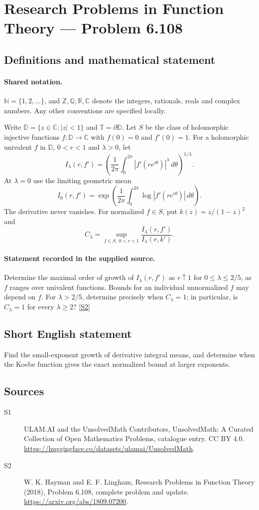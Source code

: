 \documentclass[11pt]{article}
\newcommand{\sref}[2]{\hyperlink{source:#1:#2}{[S#2]}}
\begin{document}
\section{Research Problems in Function Theory — Problem 6.108}\label{statement}

\subsection{Definitions and mathematical statement}

\paragraph{Shared notation.}$\mathbb N=\{1,2,\ldots\}$, and $\mathbb Z,\mathbb Q,\mathbb R,\mathbb C$ denote the integers, rationals, reals and complex numbers. Any other conventions are specified locally.


Write $\mathbb D=\{z\in\mathbb C:|z|<1\}$ and $\mathbb T=\partial\mathbb D$. Let $S$ be the class of holomorphic injective functions $f:\mathbb D\to\mathbb C$ with $f(0)=0$ and $f'(0)=1$. For a holomorphic univalent $f$ in $\mathbb D$, $0<r<1$ and $\lambda>0$, let
\[I_\lambda(r,f')=\left(\frac1{2\pi}\int_0^{2\pi}|f'(re^{i\theta})|^\lambda\,d\theta\right)^{1/\lambda}.\]
At $\lambda=0$ use the limiting geometric mean
\[I_0(r,f')=\exp\left(\frac1{2\pi}\int_0^{2\pi}\log|f'(re^{i\theta})|\,d\theta\right).\]
The derivative never vanishes. For normalized $f\in S$, put $k(z)=z/(1-z)^2$ and
\[C_\lambda=\sup_{f\in S,\ 0<r<1}\frac{I_\lambda(r,f')}{I_\lambda(r,k')}.\]
\paragraph{Statement recorded in the supplied source.}
Determine the maximal order of growth of $I_\lambda(r,f')$ as $r\uparrow1$ for $0\leq\lambda\leq2/5$, as $f$ ranges over univalent functions. Bounds for an individual unnormalized $f$ may depend on $f$. For $\lambda>2/5$, determine precisely when $C_\lambda=1$; in particular, is $C_\lambda=1$ for every $\lambda\geq2$? \sref{statement}{2}
\subsection{Short English statement}
Find the small-exponent growth of derivative integral means, and determine when the Koebe function gives the exact normalized bound at larger exponents.
\subsection{Sources}
\begin{description}
\item[\hypertarget{source:statement:1}{S1}] ULAM.AI and the UnsolvedMath Contributors, UnsolvedMath: A Curated Collection of Open Mathematics Problems, catalogue entry. CC BY 4.0. \url{https://huggingface.co/datasets/ulamai/UnsolvedMath}.
\item[\hypertarget{source:statement:2}{S2}] W. K. Hayman and E. F. Lingham, Research Problems in Function Theory (2018), Problem 6.108, complete problem and update. \url{https://arxiv.org/abs/1809.07200}.
\end{description}
\label{end:statement}
\end{document}
